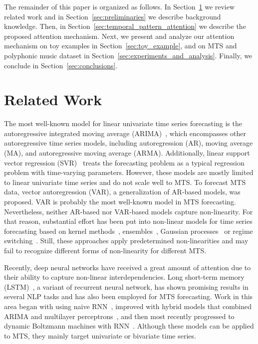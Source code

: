 The remainder of this paper is organized as follows.
In Section~\ref{sec:related_work} we review related work and in Section~\ref{sec:preliminaries} we describe background knowledge.
Then, in Section~\ref{sec:temporal_pattern_attention} we describe the proposed attention mechanism.
Next, we present and analyze our attention mechanism on toy examples in Section~\ref{sec:toy_example}, and on MTS and polyphonic music dataset in Section~\ref{sec:experiments_and_analysis}.
Finally, we conclude in Section~\ref{sec:conclusions}.

\section{Related Work}\label{sec:related_work}

The most well-known model for linear univariate time series forecasting is the autoregressive integrated moving average (ARIMA)~\cite{autoregression_0}, which encompasses other autoregressive time series models, including autoregression (AR), moving average (MA), and autoregressive moving average (ARMA). 
Additionally, linear support vector regression (SVR)~\cite{SVR_0,SVR_1} treats the forecasting problem as a typical regression problem with time-varying parameters.
However, these models are mostly limited to linear univariate time series and do not scale well to MTS.
To forecast MTS data, vector autoregression (VAR), a generalization of AR-based models, was proposed.
VAR is probably the most well-known model in MTS forecasting.
Nevertheless, neither AR-based nor VAR-based models capture non-linearity.
For that reason, substantial effort has been put into non-linear models for time series forecasting based on kernel methods~\cite{kernel-method}, ensembles~\cite{ensemble-method}, Gaussian processes~\cite{Gaussian-Process_0} or regime switching~\cite{SETAR}.
Still, these approaches apply predetermined non-linearities and may fail to recognize different forms of non-linearity for different MTS.

Recently, deep neural networks have received a great amount of attention due to their ability to capture non-linear interdependencies.
Long short-term memory (LSTM)~\cite{lstm}, a variant of recurrent neural network, has shown promising results in several NLP tasks and has also been employed for MTS forecasting.
Work in this area began with using naive RNN~\cite{naive-RNN}, improved with hybrid models that combined ARIMA and multilayer perceptrons~\cite{forecasting-ANN,forecasting-hybrid-NN,hybrid}, and then most recently progressed to dynamic Boltzmann machines with RNN~\cite{DyBM}.
Although these models can be applied to MTS, they mainly target univariate or bivariate time series.

